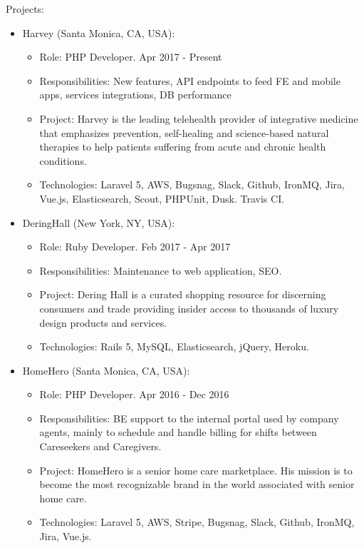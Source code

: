 \documentclass[11pt,a4paper,sans]{moderncv}        %
\begin{document}
  {
    Projects:\\
    \begin{itemize}
      \item Harvey (Santa Monica, CA, USA):
        \begin{itemize}
          \item Role: PHP Developer. Apr 2017 - Present
          \item Responsibilities: New features, API endpoints to feed FE and mobile apps, services integrations, DB performance
          \item Project: Harvey is the leading telehealth provider of integrative medicine that emphasizes prevention, self-healing and science-based natural therapies to help patients suffering from acute and chronic health conditions.
          \item Technologies: Laravel 5, AWS, Bugsnag, Slack, Github, IronMQ, Jira, Vue.js, Elasticsearch, Scout, PHPUnit, Dusk. Travis CI.
        \end{itemize}
      \item DeringHall (New York, NY, USA):
        \begin{itemize}
          \item Role: Ruby Developer. Feb 2017 - Apr 2017
          \item Responsibilities: Maintenance to web application, SEO.
          \item Project: Dering Hall is a curated shopping resource for discerning consumers and trade providing insider access to thousands of luxury design products and services.
          \item Technologies: Rails 5, MySQL, Elasticsearch, jQuery, Heroku.
        \end{itemize}
      \item HomeHero (Santa Monica, CA, USA):
        \begin{itemize}
          \item Role: PHP Developer. Apr 2016 - Dec 2016
          \item Responsibilities: BE support to the internal portal used by company agents, mainly to schedule and handle billing for shifts between Careseekers and Caregivers.
          \item Project: HomeHero is a senior home care marketplace. His mission is to become the most recognizable brand in the world associated with senior home care.
          \item Technologies: Laravel 5, AWS, Stripe, Bugsnag, Slack, Github, IronMQ, Jira, Vue.js.
        \end{itemize}
    \end{itemize}
  }
\end{document}

